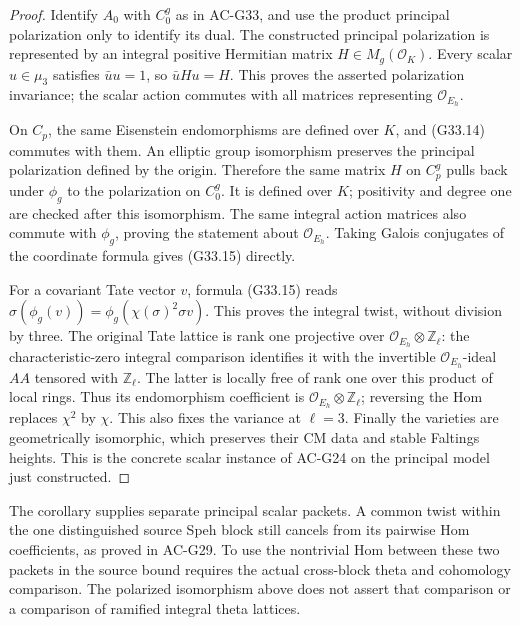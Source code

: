 \begin{proof}
Identify $A_0$ with $C_0^g$ as in AC-G33, and use the
product principal polarization only to identify its dual.
The constructed principal polarization is represented by
an integral positive Hermitian matrix
$H\in M_g(\mathcal O_K)$.
Every scalar $u\in\mu_3$ satisfies $\bar u u=1$, so
$\bar u H u=H$.  This proves the asserted polarization
invariance; the scalar action commutes with all matrices
representing $\mathcal O_{E_h}$.

On $C_p$, the same Eisenstein endomorphisms are defined over
$K$, and (G33.14) commutes with them.  An elliptic group
isomorphism preserves the principal polarization defined by
the origin.  Therefore the same matrix $H$ on $C_p^g$
pulls back under $\phi_g$ to the polarization on $C_0^g$.
It is defined over $K$; positivity and degree one are
checked after this isomorphism.  The same integral action
matrices also commute with $\phi_g$, proving the statement
about $\mathcal O_{E_h}$.  Taking Galois conjugates of the
coordinate formula gives (G33.15) directly.

For a covariant Tate vector $v$, formula (G33.15) reads
$\sigma(\phi_g(v))=\phi_g(\chi(\sigma)^2\sigma v)$.
This proves the integral twist, without division by three.
The original Tate lattice is rank one projective over
$\mathcal O_{E_h}\otimes\mathbb Z_\ell$: the characteristic-zero
integral comparison identifies it with the invertible
$\mathcal O_{E_h}$-ideal $AA$ tensored with $\mathbb Z_\ell$.
The latter is locally free of rank one over this product
of local rings.  Thus its endomorphism coefficient is
$\mathcal O_{E_h}\otimes\mathbb Z_\ell$; reversing the Hom
replaces $\chi^2$ by $\chi$.  This also fixes the variance
at $\ell=3$.
Finally the varieties are geometrically isomorphic, which
preserves their CM data and stable Faltings heights.
This is the concrete scalar instance of AC-G24 on the
principal model just constructed.
\end{proof}

The corollary supplies separate principal scalar packets.
A common twist within the one distinguished source Speh
block still cancels from its pairwise Hom coefficients,
as proved in AC-G29.  To use the nontrivial Hom between
these two packets in the source bound requires the actual
cross-block theta and cohomology comparison.  The polarized
isomorphism above does not assert that comparison or a
comparison of ramified integral theta lattices.
